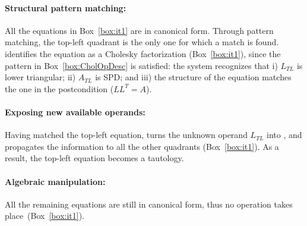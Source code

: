 \documentclass{llncs}
\newcommand{\unknown}[1]{\textcolor{unknown}{#1}}
\newcommand{\click}{{\sc{Cl\makebox[.58\width][c]{1}ck}}}
\begin{document}
\paragraph{\bf Structural pattern matching:} 
All the equations in Box~\ref{box:it1} are in canonical form.
Through pattern matching, the top-left quadrant is the only one for which a match is found. 
\click{} identifies the equation as a Cholesky factorization (Box~\ref{box:it1}),
since the pattern in Box~\ref{box:CholOpDesc} is satisfied: the system recognizes that 
i) $L_{TL}$ is lower triangular;
ii) $A_{TL}$ is SPD; and 
iii) the structure of the equation matches the one in the postcondition ($L L^T = A$).

\paragraph{\bf Exposing new available operands:} 
Having matched the top-left equation, \click{}
turns the unknown operand \unknown{$L_{TL}$}
into , and propagates the information to all the other quadrants
(Box~\ref{box:it1}).
As a result, the top-left equation becomes a tautology.

\paragraph{\bf Algebraic manipulation:} 
All the remaining equations are still in canonical form,
 thus no operation takes place~(Box~\ref{box:it1}).
\end{document}
